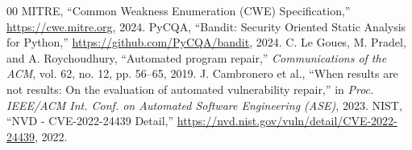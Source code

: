 \documentclass[conference]{IEEEtran}
\begin{document}
\begin{thebibliography}{00}
 MITRE, ``Common Weakness Enumeration (CWE) Specification,'' \url{https://cwe.mitre.org}, 2024.
 PyCQA, ``Bandit: Security Oriented Static Analysis for Python,'' \url{https://github.com/PyCQA/bandit}, 2024.
 C. Le Goues, M. Pradel, and A. Roychoudhury, ``Automated program repair,'' \textit{Communications of the ACM}, vol. 62, no. 12, pp. 56--65, 2019.
 J. Cambronero et al., ``When results are not results: On the evaluation of automated vulnerability repair,'' in \textit{Proc. IEEE/ACM Int. Conf. on Automated Software Engineering (ASE)}, 2023.
 NIST, ``NVD - CVE-2022-24439 Detail,'' \url{https://nvd.nist.gov/vuln/detail/CVE-2022-24439}, 2022.
\end{thebibliography}
\end{document}
